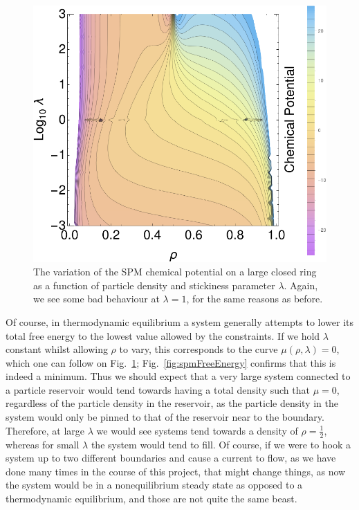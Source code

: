 \begin{figure}[h!]
 \caption[The chemical potential of the SPM on a closed ring, as a function of density
 and $\lambda$.]{\label{fig:spmChemPot} 
 The variation of the SPM chemical potential on a large closed ring as a function of particle 
 density and stickiness parameter $\lambda$. Again, we see some bad behaviour at $\lambda=1$,
 for the same reasons as before.
 }
  \begin{center}
 \includegraphics[width=1.0\textwidth]{analytics/images/spmChemPot}
  \end{center}
\end{figure}
Of course, in thermodynamic equilibrium a system generally attempts to lower its total free energy
to the lowest value allowed by the constraints. If we hold $\lambda$ constant whilst allowing $\rho$
to vary, this corresponds to the curve $\mu(\rho, \lambda)=0$, which one can follow on
Fig.~\ref{fig:spmChemPot}; Fig.~\ref{fig:spmFreeEnergy} confirms that this is indeed
a minimum. Thus we should expect that a very large system connected to a particle reservoir would
tend towards having a total density such that $\mu = 0$, regardless of the particle density
in the reservoir, as the particle density in the system would only be pinned to that of the
reservoir near to the boundary. Therefore, at large $\lambda$ we would see systems tend towards a
density of $\rho=\frac{1}{2}$, whereas for small $\lambda$ the system would tend to fill.
Of course, if we were to hook a system up to two different boundaries and cause a current to flow,
as we have done many times in the course of this project,
that might change things, as now the system would be in a nonequilibrium steady state as opposed
to a thermodynamic equilibrium, and those are not quite the same beast.

